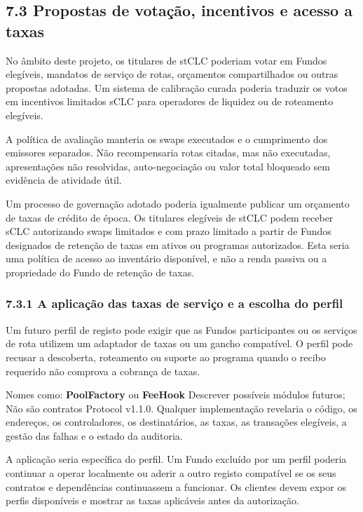 \documentclass[11pt]{article}
\begin{document}
\subsection*{7.3 Propostas de votação, incentivos e acesso a taxas}

No âmbito deste projeto, os titulares de stCLC poderiam votar em Fundos elegíveis, mandatos de serviço de rotas, orçamentos compartilhados ou outras propostas adotadas. Um sistema de calibração curada poderia traduzir os votos em incentivos limitados sCLC para operadores de liquidez ou de roteamento elegíveis.

A política de avaliação manteria os swaps executados e o cumprimento dos emissores separados. Não recompensaria rotas citadas, mas não executadas, apresentações não resolvidas, auto-negociação ou valor total bloqueado sem evidência de atividade útil.

Um processo de governação adotado poderia igualmente publicar um orçamento de taxas de crédito de época. Os titulares elegíveis de stCLC podem receber sCLC autorizando swaps limitados e com prazo limitado a partir de Fundos designados de retenção de taxas em ativos ou programas autorizados. Esta seria uma política de acesso ao inventário disponível, e não a renda passiva ou a propriedade do Fundo de retenção de taxas.

\subsubsection*{7.3.1 A aplicação das taxas de serviço e a escolha do perfil}

Um futuro perfil de registo pode exigir que as Fundos participantes ou os serviços de rota utilizem um adaptador de taxas ou um gancho compatível. O perfil pode recusar a descoberta, roteamento ou suporte ao programa quando o recibo requerido não comprova a cobrança de taxas.

Nomes como: \textbf{PoolFactory} ou \textbf{FeeHook} Descrever possíveis módulos futuros; Não são contratos Protocol v1.1.0. Qualquer implementação revelaria o código, os endereços, os controladores, os destinatários, as taxas, as transações elegíveis, a gestão das falhas e o estado da auditoria.

A aplicação seria específica do perfil. Um Fundo excluído por um perfil poderia continuar a operar localmente ou aderir a outro registo compatível se os seus contratos e dependências continuassem a funcionar. Os clientes devem expor os perfis disponíveis e mostrar as taxas aplicáveis antes da autorização.
\end{document}
